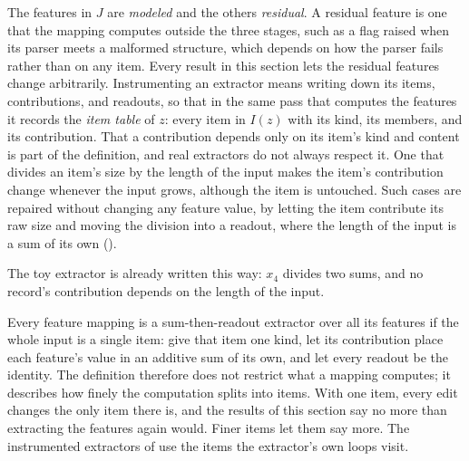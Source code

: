 \noindent The features in $J$ are \emph{modeled} and the others \emph{residual}. A residual feature is one that the
mapping computes outside the three stages, such as a flag raised when its parser meets a malformed structure, which
depends on how the parser fails rather than on any item. Every result in this section lets the residual features
change arbitrarily. Instrumenting an extractor means writing down its items, contributions, and readouts, so that in
the same pass that computes the features it records the \emph{item table} of $z$: every item in $I(z)$ with its kind,
its members, and its contribution. That a contribution depends only on its item's kind and content is part of the
definition, and real extractors do not always respect it. One that divides an item's size by the length of the input
makes the item's contribution change whenever the input grows, although the item is untouched. Such cases are repaired
without changing any feature value, by letting the item contribute its raw size and moving the division into a
readout, where the length of the input is a sum of its own ().
\begin{runex}
The toy extractor is already written this way: $x_4$ divides two sums, and no record's contribution depends on the
length of the input.
\end{runex}

\remark[Granularity]
\label{rem:fw:granularity}
{
Every feature mapping is a sum-then-readout extractor over all its features if the whole input is a single item:
give that item one kind, let its contribution place each feature's value in an additive sum of its own, and let every
readout be the identity. The definition therefore does not restrict what a mapping computes; it describes how finely
the computation splits into items. With one item, every edit changes the only item there is, and the results of this
section say no more than extracting the features again would. Finer items let them say more. The instrumented
extractors of  use the items the extractor's own loops visit.
}

